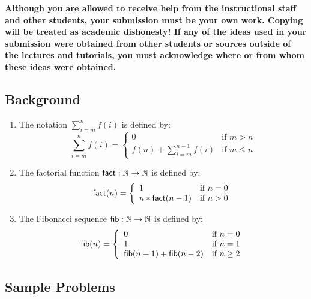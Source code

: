 \documentclass[11pt,fleqn]{article}
\newcommand{\mname}[1]{\mbox{\sf #1}}
\begin{document}
\textbf{Although you are allowed to receive help from the
  instructional staff and other students, your submission must be your
  own work.  Copying will be treated as academic dishonesty! If any of
  the ideas used in your submission were obtained from other students
  or sources outside of the lectures and tutorials, you must
  acknowledge where or from whom these ideas were obtained.}

\subsection*{Background}

\begin{enumerate}

  \item The notation $\sum^{n}_{i=m}f(i)$ is defined by: 
    \[\sum^{n}_{i=m}f(i) =
      \left\{\begin{array}{ll}
               0                          & \textrm{if } m > n\\
               f(n) + \sum^{n-1}_{i=m}f(i) & \textrm{if } m \le n
             \end{array}
      \right.\] 

  \item The factorial function $\mname{fact} : \mathbb{N} \rightarrow
    \mathbb{N}$ is defined by:
    \[\mname{fact}(n) = 
      \left\{\begin{array}{ll}
               1 & \textrm{if } n = 0 \\
               n * \mname{fact}(n-1) & \textrm{if } n > 0 
             \end{array}
      \right.\]

  \item The Fibonacci sequence $\mname{fib} : \mathbb{N} \rightarrow
    \mathbb{N}$ is defined by:
    \[\mname{fib}(n) = 
      \left\{\begin{array}{ll}
               0 & \textrm{if } n = 0 \\
               1 & \textrm{if } n = 1 \\
               \mname{fib}(n-1) + \mname{fib}(n-2) & \textrm{if } n \ge 2
             \end{array}
      \right.\]

\end{enumerate}

\subsection*{Sample Problems}
\end{document}
